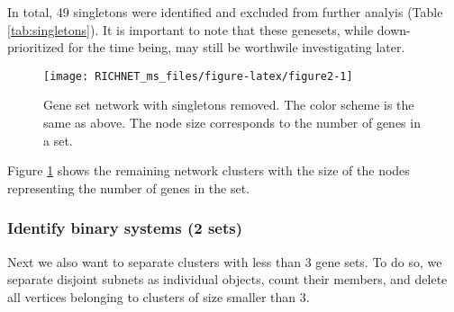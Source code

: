 \documentclass[9pt,a4paper,]{extarticle}
\newenvironment{Shaded}{\begin{snugshade}}{\end{snugshade}}
\newcommand{\KeywordTok}[1]{\textcolor[rgb]{0.13,0.29,0.53}{\textbf{#1}}}
\newcommand{\DataTypeTok}[1]{\textcolor[rgb]{0.13,0.29,0.53}{#1}}
\newcommand{\DecValTok}[1]{\textcolor[rgb]{0.00,0.00,0.81}{#1}}
\newcommand{\StringTok}[1]{\textcolor[rgb]{0.31,0.60,0.02}{#1}}
\newcommand{\OperatorTok}[1]{\textcolor[rgb]{0.81,0.36,0.00}{\textbf{#1}}}
\newcommand{\NormalTok}[1]{#1}
\begin{document}
In total, 49 singletons were identified and excluded from further analyis (Table \ref{tab:singletons}). It is important to note that these genesets, while down-prioritized for the time being, may still be worthwile investigating later.

\begin{figure}

{\centering \texttt{[image: RICHNET\_ms\_files/figure-latex/figure2-1]} 

}

\caption{Gene set network with singletons removed. The color scheme is the same as above. The node size corresponds to the number of genes in a set.}\label{fig:figure2}
\end{figure}

\begin{Shaded}
\end{Shaded}

Figure \ref{fig:figure2} shows the remaining network clusters with the size of the nodes representing the number of genes in the set.

\subsubsection{Identify binary systems (2 sets)}\label{identify-binary-systems-2-sets}

Next we also want to separate clusters with less than 3 gene sets. To do so, we separate disjoint subnets as individual objects, count their members, and delete all vertices belonging to clusters of size smaller than 3.
\end{document}
